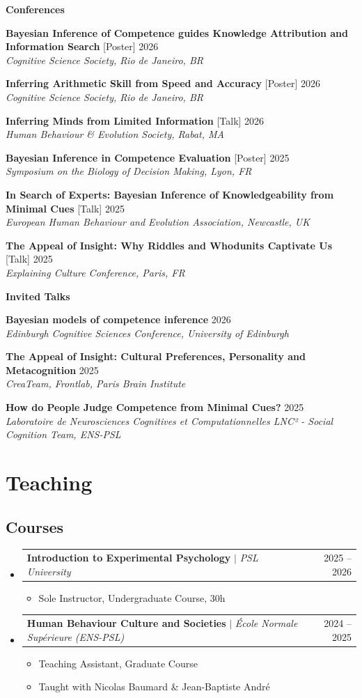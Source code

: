 \documentclass[letterpaper,11pt]{article}
\makeatletter
\newcommand{\resumeItem}[1]{
  \item\small{
    {#1 \vspace{-2pt}}
  }
}
\newcommand{\resumeItemWithYear}[3][ ]{ %
  \item\small{
    #2 \hfill {\small #3} \\
    #1
  }
}
\newcommand{\resumePublicationHeading}[1]{
  \vspace{5pt} %
  \noindent\textbf{\small #1} %
  \vspace{2pt} %
}
\newcommand{\resumeProjectHeading}[2]{
    \item
    \begin{tabular*}{0.97\textwidth}{l@{\extracolsep{\fill}}r}
      \small#1 & #2 \\
    \end{tabular*}\vspace{-7pt}
}
\newcommand{\resumeSubHeadingListStart}{\begin{itemize}[leftmargin=0.15in, label={}]}
\newcommand{\resumeSubHeadingListEnd}{\end{itemize}}
\newcommand{\resumeItemListStart}{\begin{itemize}}
\newcommand{\resumeItemListEnd}{\end{itemize}\vspace{-5pt}}
\makeatother
\begin{document}
\resumePublicationHeading{Conferences}
\begin{etaremune}
  \resumeItemWithYear{\textbf{Bayesian Inference of Competence guides Knowledge Attribution and Information Search} [Poster]}{2026}{\textit{Cognitive Science Society, Rio de Janeiro, BR}}
  \resumeItemWithYear{\textbf{Inferring Arithmetic Skill from Speed and Accuracy} [Poster]}{2026}{\textit{Cognitive Science Society, Rio de Janeiro, BR}}
  \resumeItemWithYear{\textbf{Inferring Minds from Limited Information} [Talk]}{2026}{\textit{Human Behaviour \& Evolution Society, Rabat, MA}}
  \resumeItemWithYear{\textbf{Bayesian Inference in Competence Evaluation} [Poster]}{2025}{\textit{Symposium on the Biology of Decision Making, Lyon, FR}}
  \resumeItemWithYear{\textbf{In Search of Experts: Bayesian Inference of Knowledgeability from Minimal Cues} [Talk]}{2025}{\textit{European Human Behaviour and Evolution Association, Newcastle, UK}}
  \resumeItemWithYear{\textbf{The Appeal of Insight: Why Riddles and Whodunits Captivate Us} [Talk]}{2025}{\textit{Explaining Culture Conference, Paris, FR}}
\end{etaremune}

\resumePublicationHeading{Invited Talks}
\begin{etaremune}
  \resumeItemWithYear{\textbf{Bayesian models of competence inference}}{2026}{\textit{Edinburgh Cognitive Sciences Conference, University of Edinburgh}}
  \resumeItemWithYear{\textbf{The Appeal of Insight: Cultural Preferences, Personality and Metacognition}}{2025}{\textit{CreaTeam, Frontlab, Paris Brain Institute}}
  \resumeItemWithYear{\textbf{How do People Judge Competence from Minimal Cues?}}{2025}{\textit{Laboratoire de Neurosciences Cognitives et Computationnelles LNC² - Social Cognition Team, ENS-PSL}}
\end{etaremune}

\section{Teaching}

\subsection*{Courses}
    \resumeSubHeadingListStart
    \resumeProjectHeading
        {\textbf{Introduction to Experimental Psychology} $|$ \emph{PSL University}}{2025 -- 2026}
        \resumeItemListStart
          \resumeItem{Sole Instructor, Undergraduate Course, 30h}
        \resumeItemListEnd
    \resumeSubHeadingListEnd
    \resumeSubHeadingListStart
      \resumeProjectHeading
          {\textbf{Human Behaviour Culture and Societies} $|$ \emph{École Normale Supérieure (ENS-PSL)}}{2024 -- 2025}
          \resumeItemListStart
            \resumeItem{Teaching Assistant, Graduate Course}
            \resumeItem{Taught with Nicolas Baumard \& Jean-Baptiste André}
          \resumeItemListEnd
    \resumeSubHeadingListEnd
\end{document}
